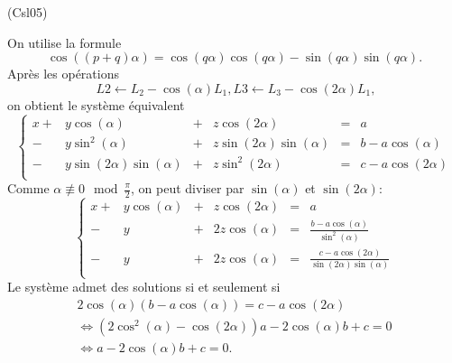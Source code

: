 \begin{tiny}(Csl05)\end{tiny} On utilise la formule
\[
  \cos((p+q)\alpha) = \cos(q\alpha) \cos(q\alpha) - \sin(q\alpha) \sin(q\alpha).
\]
Après les opérations
\[
\; L2 \leftarrow L_2 - \cos(\alpha)L_1, L3 \leftarrow L_3 - \cos(2\alpha)L_1,
\]
on obtient le système équivalent
\[
\left\lbrace  
\begin{alignedat}{4}
  x +& y\cos(\alpha)              &+& z\cos(2\alpha)             &=& a \\
    -& y\sin^2(\alpha)            &+& z\sin(2\alpha)\sin(\alpha) &=& b-a\cos(\alpha) \\
    -& y\sin(2\alpha)\sin(\alpha) &+& z\sin^2(2\alpha)           &=& c-a\cos(2\alpha) \\
\end{alignedat}
\right.
\]
Comme $\alpha \not \equiv 0 \mod \frac{\pi}{2}$, on peut diviser par $\sin(\alpha)$ et $\sin(2\alpha)$:
\[
\left\lbrace  
\begin{alignedat}{4}
  x +& y\cos(\alpha) &+& z\cos(2\alpha) &=& a \\
    -& y             &+& 2z\cos(\alpha) &=& \frac{b-a\cos(\alpha)}{\sin^2(\alpha)} \\
    -& y             &+& 2z\cos(\alpha) &=& \frac{c-a\cos(2\alpha)}{\sin(2\alpha)\sin(\alpha)} \\
\end{alignedat}
\right.
\]
Le système admet des solutions si et seulement si
\begin{multline*}
  2\cos(\alpha)(b-a\cos(\alpha)) = c - a \cos(2\alpha)\\
  \Leftrightarrow
  (2\cos^2(\alpha)-\cos(2\alpha))a - 2\cos(\alpha)b  + c = 0\\
  \Leftrightarrow a - 2\cos(\alpha)b  + c = 0.
\end{multline*}
